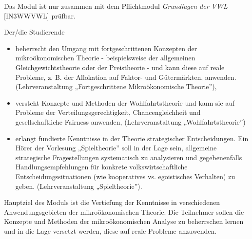 \begin{module}
\begin{styleenv}
\begin{conditions}
 

Das Modul ist nur zusammen mit dem Pflichtmodul \emph{Grundlagen der VWL} [IN3WWVWL] prüfbar.

\end{conditions}


\end{styleenv}

\begin{learningoutcomes}
Der/die Studierende

 \begin{itemize}\item beherrscht den Umgang mit fortgeschrittenen Konzepten der mikroökonomischen Theorie - beispielsweise der allgemeinen Gleichgewichtstheorie oder der Preistheorie - und kann diese auf reale Probleme, z. B. der Allokation auf Faktor- und Gütermärkten, anwenden. (Lehrveranstaltung „Fortgeschrittene Mikroökonomische Theorie”),  \item versteht Konzepte und Methoden der Wohlfahrtstheorie und kann sie auf Probleme der Verteilungsgerechtigkeit, Chancengleichheit und gesellschaftliche Fairness anwenden, (Lehrveranstaltung „Wohlfahrtstheorie”)  \item erlangt fundierte Kenntnisse in der Theorie strategischer Entscheidungen. Ein Hörer der Vorlesung „Spieltheorie” soll in der Lage sein, allgemeine strategische Fragestellungen systematisch zu analysieren und gegebenenfalls Handlungsempfehlungen für konkrete volkswirtschaftliche Entscheidungssituationen (wie kooperatives vs. egoistisches Verhalten) zu geben. (Lehrveranstaltung „Spieltheorie”).  \end{itemize}
\end{learningoutcomes}

\begin{content}
Hauptziel des Moduls ist die Vertiefung der Kenntnisse in verschiedenen Anwendungsgebieten der mikroökonomischen Theorie. Die Teilnehmer sollen die Konzepte und Methoden der mikroökonomischen Analyse zu beherrschen lernen und in die Lage versetzt werden, diese auf reale Probleme anzuwenden.


\end{content}



\end{module}

